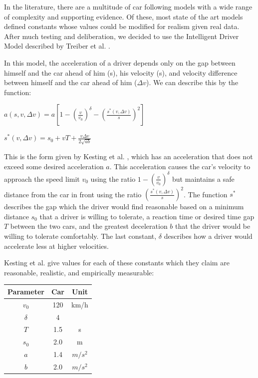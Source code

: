 In the literature, there are a multitude of car following models with a wide range of complexity and supporting evidence. Of these, most state of the art models defined constants whose values could be modified for realism given real data. After much testing and deliberation, we decided to use the Intelligent Driver Model described by Treiber et al. \cite{treiber}.

In this model, the acceleration of a driver depends only on the gap between himself and the car ahead of him (s), his velocity (s), and velocity difference between himself and the car ahead of him ($\Delta v$). We can describe this by the function:

$a(s, v, \Delta v) = a \left[1 - \left(\frac{v}{v_0}\right)^\delta - \left( \frac{s^*(v, \Delta v)}{s} \right)^2 \right]$

$s^*(v, \Delta v) = s_0 + vT + \frac{v\Delta v}{2\sqrt{ab}} $

This is the form given by Kesting et al. \cite{kesting}, which has an acceleration that does not exceed some desired acceleration $a$. This acceleration causes the car’s velocity to approach the speed limit $v_0$ using the ratio $ 1 - \left( \frac {v} {v_0} \right) ^ \delta $ but maintains a safe distance from the car in front using the ratio $ \left( \frac {s^*( v, \Delta v )} {s} \right) ^2 $. The function $s^*$ describes the gap which the driver would find reasonable based on a minimum distance $s_0$ that a driver is willing to tolerate, a reaction time or desired time gap $T$ between the two cars, and the greatest deceleration $b$ that the driver would be willing  to tolerate comfortably. The last constant, $\delta$ describes how a driver would accelerate less at higher velocities.

Kesting et al. give values for each of these constants which they claim are reasonable, realistic, and empirically measurable:


\begin{tabular}{ccc}
\hline
Parameter & Car & Unit                  \\ \hline
$v_0$     & 120 & km/h                  \\
$\delta$   & 4   &                       \\
$T$        & 1.5 & s                     \\
$s_0$     & 2.0 & m                     \\
$a$        & 1.4 & $m/s^2$ \\
$b$        & 2.0 & $m/s^2$
\end{tabular}


